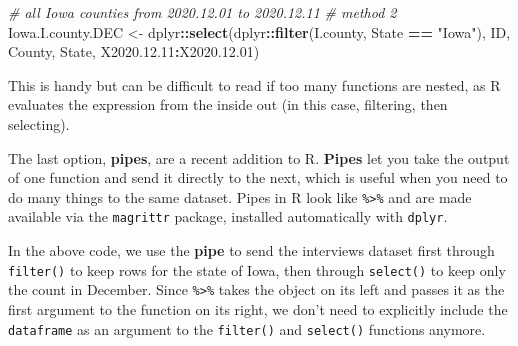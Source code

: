 \documentclass[]{book}
\newenvironment{Shaded}{\begin{snugshade}}{\end{snugshade}}
\newcommand{\KeywordTok}[1]{\textcolor[rgb]{0.13,0.29,0.53}{\textbf{#1}}}
\newcommand{\FloatTok}[1]{\textcolor[rgb]{0.00,0.00,0.81}{#1}}
\newcommand{\StringTok}[1]{\textcolor[rgb]{0.31,0.60,0.02}{#1}}
\newcommand{\CommentTok}[1]{\textcolor[rgb]{0.56,0.35,0.01}{\textit{#1}}}
\newcommand{\OperatorTok}[1]{\textcolor[rgb]{0.81,0.36,0.00}{\textbf{#1}}}
\newcommand{\NormalTok}[1]{#1}
\begin{document}
\begin{Shaded}
\begin{Highlighting}[]
\CommentTok{# all Iowa counties from 2020.12.01 to 2020.12.11}
\CommentTok{# method 2}
\NormalTok{Iowa.I.county.DEC <-}\StringTok{ }
\StringTok{  }\NormalTok{dplyr}\OperatorTok{::}\KeywordTok{select}\NormalTok{(dplyr}\OperatorTok{::}\KeywordTok{filter}\NormalTok{(I.county, State }\OperatorTok{==}\StringTok{ "Iowa"}\NormalTok{), }
\NormalTok{                ID, County, State, X2020.}\FloatTok{12.11}\OperatorTok{:}\NormalTok{X2020.}\FloatTok{12.01}\NormalTok{)}
\end{Highlighting}
\end{Shaded}

This is handy but can be difficult to read if too many functions are
nested, as R evaluates the expression from the inside out (in this case,
filtering, then selecting).

The last option, \textbf{pipes}, are a recent addition to R.
\textbf{Pipes} let you take the output of one function and send it
directly to the next, which is useful when you need to do many things to
the same dataset. Pipes in R look like \texttt{\%\textgreater{}\%} and
are made available via the \texttt{magrittr} package, installed
automatically with \texttt{dplyr}.

\begin{Shaded}
\end{Shaded}

In the above code, we use the \textbf{pipe} to send the interviews
dataset first through \texttt{filter()} to keep rows for the state of
Iowa, then through \texttt{select()} to keep only the count in December.
Since \texttt{\%\textgreater{}\%} takes the object on its left and
passes it as the first argument to the function on its right, we don't
need to explicitly include the \texttt{dataframe} as an argument to the
\texttt{filter()} and \texttt{select()} functions anymore.
\end{document}
